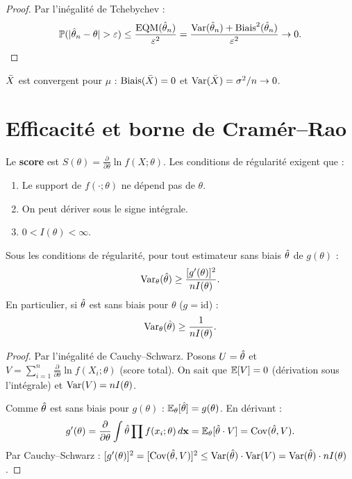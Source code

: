 \begin{proof}
Par l'in\'egalit\'e de Tchebychev :
\[
\Prob(|\thetahat_n-\theta|>\varepsilon) \leq \frac{\EQM(\thetahat_n)}{\varepsilon^2} = \frac{\Var(\thetahat_n)+\Biais^2(\thetahat_n)}{\varepsilon^2} \to 0. \qedhere
\]
\end{proof}

\begin{exemple}
$\bar{X}$ est convergent pour $\mu$ : $\operatorname{Biais}(\bar{X})=0$ et $\operatorname{Var}(\bar{X})=\sigma^2/n\to 0$.
\end{exemple}

\section{Efficacit\'e et borne de Cram\'er--Rao}

\begin{definition}
Le \textbf{score} est $S(\theta)=\frac{\partial}{\partial\theta}\ln f(X;\theta)$. Les conditions de r\'egularit\'e exigent que :
\begin{enumerate}
\item Le support de $f(\cdot;\theta)$ ne d\'epend pas de $\theta$.
\item On peut d\'eriver sous le signe int\'egrale.
\item $0 < I(\theta) < \infty$.
\end{enumerate}
\end{definition}

\begin{theoreme}
\label{thm:cramer-rao}
Sous les conditions de r\'egularit\'e, pour tout estimateur sans biais $\hat{\theta}$ de $g(\theta)$ :
\[
\operatorname{Var}_\theta(\hat{\theta}) \geq \frac{[g'(\theta)]^2}{nI(\theta)}.
\]
En particulier, si $\hat{\theta}$ est sans biais pour $\theta$ ($g=\mathrm{id}$) :
\[
\operatorname{Var}_\theta(\hat{\theta}) \geq \frac{1}{nI(\theta)}.
\]
\end{theoreme}

\begin{proof}
Par l'in\'egalit\'e de Cauchy--Schwarz. Posons $U=\hat{\theta}$ et $V=\sum_{i=1}^n\frac{\partial}{\partial\theta}\ln f(X_i;\theta)$ (score total). On sait que $\mathbb{E}[V]=0$ (d\'erivation sous l'int\'egrale) et $\operatorname{Var}(V)=nI(\theta)$.

Comme $\hat{\theta}$ est sans biais pour $g(\theta)$ : $\mathbb{E}_\theta[\hat{\theta}]=g(\theta)$. En d\'erivant :
\[
g'(\theta) = \frac{\partial}{\partial\theta}\int \hat{\theta} \prod f(x_i;\theta)\,d\mathbf{x} = \mathbb{E}_\theta[\hat{\theta}\cdot V] = \operatorname{Cov}(\hat{\theta},V).
\]
Par Cauchy--Schwarz : $[g'(\theta)]^2 = [\operatorname{Cov}(\hat{\theta},V)]^2 \leq \operatorname{Var}(\hat{\theta})\cdot\operatorname{Var}(V) = \operatorname{Var}(\hat{\theta})\cdot nI(\theta)$.
\end{proof}

